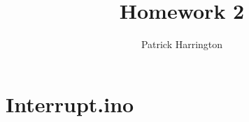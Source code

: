 \documentclass{hw}
\title{Homework 2}
\author{Patrick Harrington}
\begin{document}
\maketitle
\section{Interrupt.ino}

\end{document}
